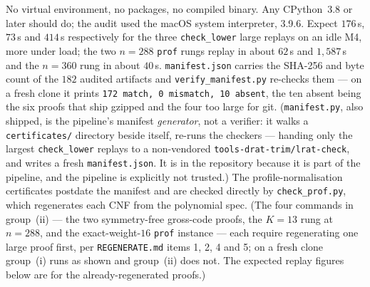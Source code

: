\documentclass[11pt]{amsart}
\theoremstyle{plain}
\theoremstyle{definition}
\theoremstyle{remark}
\begin{document}
\noindent No virtual environment, no packages, no compiled binary. Any
CPython~3.8 or later should do; the audit used the macOS system interpreter,
3.9.6. Expect $176$\,s, $73$\,s and $414$\,s respectively for the three
\texttt{check\_lower} large replays on an idle M4, more under load; the two
$n=288$ \texttt{prof} rungs replay in about $62$\,s and $1{,}587$\,s and the
$n=360$ rung in about $40$\,s. \texttt{manifest.json} carries the SHA-256 and
byte count of the $182$ audited artifacts and \texttt{verify\_manifest.py}
re-checks them --- on a fresh clone it prints \texttt{172 match, 0 mismatch, 10
absent}, the ten absent being the six proofs that ship gzipped and the four too
large for git. (\texttt{manifest.py}, also shipped, is the pipeline's manifest
\emph{generator}, not a verifier: it walks a \texttt{certificates/} directory
beside itself, re-runs the checkers --- handing only the largest
\texttt{check\_lower} replays to a non-vendored
\texttt{tools-drat-trim/lrat-check}, and writes a fresh \texttt{manifest.json}.
It is in the repository because it is part of the pipeline, and the pipeline is
explicitly not trusted.) The profile-normalisation certificates postdate the
manifest and are checked directly by \texttt{check\_prof.py}, which regenerates
each CNF from the polynomial spec. (The four commands in group~(ii) --- the two symmetry-free
gross-code proofs, the $K{=}13$ rung at $n=288$, and the exact-weight-$16$
\texttt{prof} instance --- each require regenerating one large proof first, per
\texttt{REGENERATE.md} items 1, 2, 4 and 5; on a fresh clone group~(i) runs as
shown and group~(ii) does not. The expected replay figures below are for the
already-regenerated proofs.)
\end{document}
